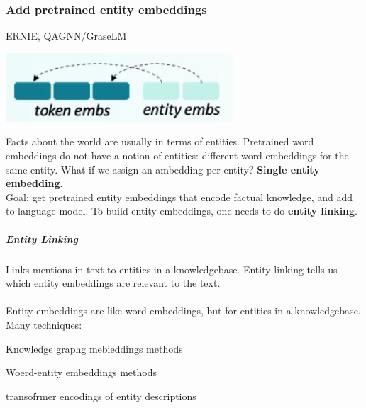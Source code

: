 \documentclass[10pt]{report}
\begin{document}
\subsubsection{Add pretrained entity embeddings} ERNIE, QAGNN/GraseLM
\begin{center}
	\includegraphics[scale=0.5]{106.png}
\end{center}
Facts about the world are usually in terms of entities. Pretrained word embeddings do not have a notion of entities: different word embeddings for the same entity. What if we assign an ambedding per entity? \textbf{Single entity embedding}.\\
Goal: get pretrained entity embeddings that encode factual knowledge, and add to language model. To build entity embeddings, one needs to do \textbf{entity linking}.
\subparagraph{Entity Linking} Links mentions in text to entities in a knowledgebase. Entity linking tells us which entity embeddings are relevant to the text.\\\\
Entity embeddings are like word embeddings, but for entities in a knowledgebase. Many techniques:
\begin{list}{}{}
	\item Knowledge graphg mebieddings methods
	\item Woerd-entity embeddings methods
	\item transofrmer encodings of entity descriptions
\end{list}
\end{document}
